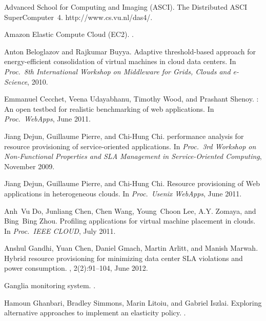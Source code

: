 \documentclass{sig-alternate-10pt}
\begin{document}
\begin{thebibliography}{10}

{Advanced School for Computing and Imaging (ASCI)}.
\newblock The Distributed ASCI SuperComputer~4. {http://www.cs.vu.nl/das4/}.

{Amazon Elastic Compute Cloud (EC2)}.
.

Anton Beloglazov and Rajkumar Buyya.
\newblock Adaptive threshold-based approach for energy-efficient consolidation
  of virtual machines in cloud data centers.
\newblock In {\em Proc.\ 8th International Workshop on Middleware for Grids,
  Clouds and e-Science}, 2010.

Emmanuel Cecchet, Veena Udayabhanu, Timothy Wood, and Prashant Shenoy.
: An open testbed for realistic benchmarking of web
  applications.
\newblock In {\em Proc.\ WebApps}, June 2011.

Jiang Dejun, Guillaume Pierre, and Chi-Hung Chi.
 performance analysis for resource provisioning of
  service-oriented applications.
\newblock In {\em Proc.\ 3rd Workshop on Non-Functional Properties and SLA
  Management in Service-Oriented Computing}, November 2009.

Jiang Dejun, Guillaume Pierre, and Chi-Hung Chi.
\newblock Resource provisioning of {W}eb applications in heterogeneous clouds.
\newblock In {\em Proc.\ Usenix WebApps}, June 2011.

Anh~Vu Do, Junliang Chen, Chen Wang, Young~Choon Lee, {A.Y.} Zomaya, and
  Bing~Bing Zhou.
\newblock Profiling applications for virtual machine placement in clouds.
\newblock In {\em Proc.\ IEEE CLOUD}, July 2011.

Anshul Gandhi, Yuan Chen, Daniel Gmach, Martin Arlitt, and Manish Marwah.
\newblock Hybrid resource provisioning for minimizing data center {SLA}
  violations and power consumption.
, 2(2):91--104,
  June 2012.

{Ganglia monitoring system}.
.

Hamoun Ghanbari, Bradley Simmons, Marin Litoiu, and Gabriel Iszlai.
\newblock Exploring alternative approaches to implement an elasticity policy.
.


\end{thebibliography}
\end{document}
